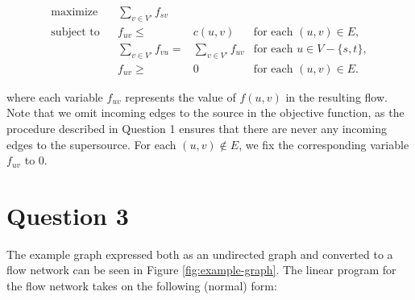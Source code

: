 \documentclass[a4paper, 10pt, oneside, article]{memoir}
\begin{document}
\begin{align*}
  \text{maximize} && \sum_{v\in V'} f_{sv} \\
  \text{subject to} && f_{uv} \leq{}& c(u,v) & \text{for each $(u,v) \in E$}, \\
                    && \sum_{v \in V'} f_{vu} ={}& \sum_{v \in V'} f_{uv} & \text{for each $u \in V - \{s, t \}$}, \\
                    && f_{uv} \geq{}& 0 & \text{for each $(u, v) \in E$}.
\end{align*}

where each variable $f_{uv}$ represents the value of $f(u,v)$ in the
resulting flow. Note that we omit incoming edges to the source in the
objective function, as the procedure described in Question 1 ensures
that there are never any incoming edges to the supersource. For each
$(u,v) \not\in E$, we fix the corresponding variable $f_{uv}$ to 0.


\section*{Question 3}

The example graph expressed both as an undirected graph and converted
to a flow network can be seen in Figure \ref{fig:example-graph}. The
linear program for the flow network takes on the following (normal)
form:
\end{document}
